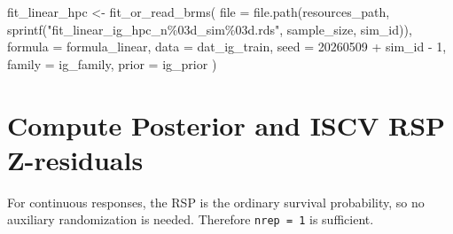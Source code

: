 \documentclass[
  english,
  letterpaper,
  DIV=11,
  numbers=noendperiod]{scrartcl}
\newenvironment{Shaded}{\begin{snugshade}}{\end{snugshade}}
\newcommand{\AttributeTok}[1]{\textcolor[rgb]{0.40,0.45,0.13}{#1}}
\newcommand{\DecValTok}[1]{\textcolor[rgb]{0.68,0.00,0.00}{#1}}
\newcommand{\FunctionTok}[1]{\textcolor[rgb]{0.28,0.35,0.67}{#1}}
\newcommand{\NormalTok}[1]{\textcolor[rgb]{0.00,0.23,0.31}{#1}}
\newcommand{\OtherTok}[1]{\textcolor[rgb]{0.00,0.23,0.31}{#1}}
\newcommand{\SpecialCharTok}[1]{\textcolor[rgb]{0.37,0.37,0.37}{#1}}
\newcommand{\StringTok}[1]{\textcolor[rgb]{0.13,0.47,0.30}{#1}}
\begin{document}
\begin{Shaded}
\begin{Highlighting}[]
\NormalTok{fit\_linear\_hpc }\OtherTok{\textless{}{-}} \FunctionTok{fit\_or\_read\_brms}\NormalTok{(}
  \AttributeTok{file =} \FunctionTok{file.path}\NormalTok{(resources\_path, }\FunctionTok{sprintf}\NormalTok{(}\StringTok{"fit\_linear\_ig\_hpc\_n\%03d\_sim\%03d.rds"}\NormalTok{, sample\_size, sim\_id)),}
  \AttributeTok{formula =}\NormalTok{ formula\_linear,}
  \AttributeTok{data =}\NormalTok{ dat\_ig\_train,}
  \AttributeTok{seed =} \DecValTok{20260509} \SpecialCharTok{+}\NormalTok{ sim\_id }\SpecialCharTok{{-}} \DecValTok{1}\NormalTok{,}
  \AttributeTok{family =}\NormalTok{ ig\_family,}
  \AttributeTok{prior =}\NormalTok{ ig\_prior}
\NormalTok{)}
\end{Highlighting}
\end{Shaded}

\section{Compute Posterior and ISCV RSP
Z-residuals}\label{compute-posterior-and-iscv-rsp-z-residuals}

For continuous responses, the RSP is the ordinary survival probability,
so no auxiliary randomization is needed. Therefore \texttt{nrep\ =\ 1}
is sufficient.
\end{document}
